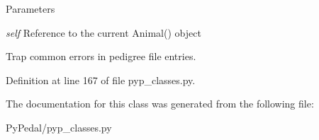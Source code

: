 \begin{DoxyParams}{Parameters}
\item[{\em self}]Reference to the current Animal() object \begin{DoxyVerb}Trap common errors in pedigree file entries.\end{DoxyVerb}
 \end{DoxyParams}


Definition at line 167 of file pyp\_\-classes.py.



The documentation for this class was generated from the following file:\begin{DoxyCompactItemize}
\item 
PyPedal/pyp\_\-classes.py\end{DoxyCompactItemize}
